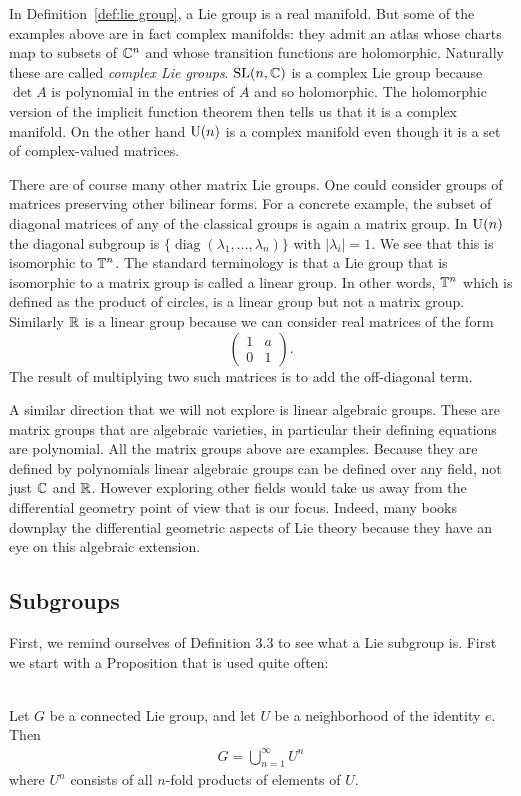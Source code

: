 In Definition~\ref{def:lie group}, a Lie group is a real manifold.
But some of the examples above are in fact complex manifolds: they admit an atlas whose charts map to subsets of $\mathbb{C}^n$ and whose transition functions are holomorphic.
Naturally these are called \emph{complex Lie groups}.
$\mathrm{SL}(n,\mathbb{C})$ is a complex Lie group because $\det A$ is polynomial in the entries of $A$ and so holomorphic.
The holomorphic version of the implicit function theorem then tells us that it is a complex manifold.
On the other hand $\mathrm{U}(n)$ is a complex manifold even though it is a set of complex-valued matrices.


There are of course many other matrix Lie groups.
One could consider groups of matrices preserving other bilinear forms. 
For a concrete example, the subset of diagonal matrices of any of the classical groups is again a matrix group.
In $\mathrm{U}(n)$ the diagonal subgroup is $\{\operatorname{diag}(\lambda_1,\dots,\lambda_n)\}$ with $|\lambda_i| = 1$.
We see that this is isomorphic to $\mathbb{T}^n$.
The standard terminology is that a Lie group that is isomorphic to a matrix group is called a linear group.
In other words, $\mathbb{T}^n$ which is defined as the product of circles, is a linear group but not a matrix group.
Similarly $\mathbb{R}$ is a linear group because we can consider real matrices of the form
\[
\begin{pmatrix}
1 & a \\
0 & 1
\end{pmatrix}.
\]
The result of multiplying two such matrices is to add the off-diagonal term.

A similar direction that we will not explore is linear algebraic groups.
These are matrix groups that are algebraic varieties, in particular their defining equations are polynomial.
All the matrix groups above are examples.
Because they are defined by polynomials linear algebraic groups can be defined over any field, not just $\mathbb{C}$ and $\mathbb{R}$.
However exploring other fields would take us away from the differential geometry point of view that is our focus.
Indeed, many books downplay the differential geometric aspects of Lie theory because they have an eye on this algebraic extension.






\subsection{Subgroups}
First, we remind ourselves of Definition 3.3 to see what a Lie subgroup is. 
First we start with a Proposition that is used quite often:
\begin{Prop}
\textup{\cite[3.18]{Warner1983}}\\
Let $G$ be a connected Lie group, and let $U$ be a neighborhood of the identity $e$. Then 
\begin{align*}
G= \bigcup_{n=1}^{\infty} U^n
\end{align*}
where $U^n$ consists of all $n$-fold products of elements of $U$.
\end{Prop}


